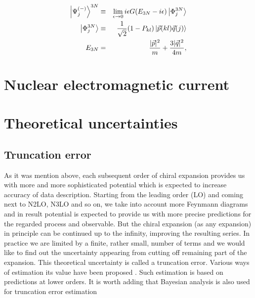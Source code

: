    \begin{eqnarray}
        \ket{\Psi^{(-)}_j}^{3N}  &\equiv& \lim_{\epsilon \rightarrow 0}
        i \epsilon G(E_{3N} - i\epsilon)\ket{\Phi^{3N}_j}\\
        \ket{\Phi^{3N}_j} &\equiv& \frac{1}{\sqrt{2}}(1 - P_{kl})
        \ket{\vec{p}(kl)\vec{q}(j)}\\
        E_{3N} &=& \frac{|\vec{p}|^2}{m} + \frac{3 |\vec{q}|^2}{4m},
    \end{eqnarray}


    \section{Nuclear electromagnetic current}

\section{Theoretical uncertainties}
    
    \subsection*{Truncation error}
    \label{sec:trunc}

    As it was mention above, each subsequent order of chiral
    expansion provides us with more and more sophisticated
    potential which is expected to increase accuracy of data description.
    Starting from the leading order (LO) and coming next to
    N2LO, N3LO and so on, we take into account more Feynmann diagrams 
    and in result potential is expected to provide us with more precise predictions
    for the regarded process and observable. But the chiral expansion (as any expansion) 
    in principle can be continued up to the infinity, improving the resulting series.
    In practice we are limited by a finite, rather small, number of terms 
    and we would like to find out
    the uncertainty appearing from cutting off remaining part of the expansion.
    This theoretical uncertainty is called a truncation error. 
    Various ways of estimation its value
    have been proposed \cite{epelkrebs2015, Epelbaum2015_trunc, Binder2015, Epelbaum_pos, Miller_arxiv}.
    Such estimation is based on predictions at lower orders.
    It is worth adding that Bayesian analysis is also used for truncation error estimation

